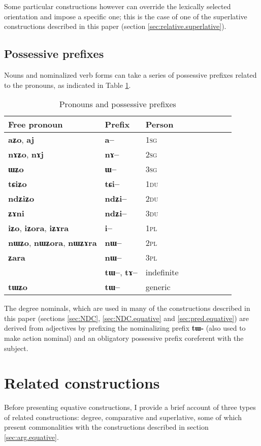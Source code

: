 \documentclass[oneside,a4paper,11pt]{article}
\newcommand{\ipa}[1]{{\phon\textbf{#1}}} %
\begin{document}
Some particular constructions however can override the lexically selected orientation and impose a specific one; this is the case of one of the superlative constructions described in this paper (section \ref{sec:relative.superlative}).

\subsection{Possessive prefixes} \label{sec:possessive}
Nouns and nominalized verb forms can take a series of possessive prefixes related to the pronouns, as indicated in Table \ref{tab:pronoun}. 


\begin{table}[H] \centering
\caption{Pronouns and possessive prefixes }\label{tab:pronoun}
\begin{tabular}{lllllllll} 
\toprule
 Free pronoun & Prefix & Person\\
\midrule
 \ipa{aʑo},    \ipa{aj} &	\ipa{a--}  &		1\textsc{sg} \\
\ipa{nɤʑo},  \ipa{nɤj} &	\ipa{nɤ--}  &			2\textsc{sg}\\
\ipa{ɯʑo}  &	\ipa{ɯ--}  &			3\textsc{sg}\\
\midrule
\ipa{tɕiʑo}  &	\ipa{tɕi--}  &			1\textsc{du} \\
\ipa{ndʑiʑo}  &	\ipa{ndʑi--}  &		2\textsc{du} \\	
\ipa{ʑɤni}  &	\ipa{ndʑi--}  &		3\textsc{du} \\	
\midrule
\ipa{iʑo}, \ipa{iʑora},   \ipa{iʑɤra}   &	\ipa{i--}  &			1\textsc{pl} \\
\ipa{nɯʑo}, \ipa{nɯʑora},   \ipa{nɯʑɤra}  &	\ipa{nɯ--}  &			2\textsc{pl} \\
\ipa{ʑara}  &	\ipa{nɯ--}  &			3\textsc{pl} \\
\midrule
&  \ipa{tɯ--},  \ipa{tɤ--} & indefinite \\
\ipa{tɯʑo} & \ipa{tɯ--}   &  generic\\
\bottomrule
\end{tabular}
\end{table}

The degree nominals, which are used in many of the constructions described in this paper (sections \ref{sec:NDC}, \ref{sec:NDC.equative} and \ref{sec:pred.equative}) are derived from adjectives by prefixing the nominalizing prefix \ipa{tɯ-} (also used to make action nominal) and an obligatory possessive prefix coreferent with the subject.

\section{Related constructions}
Before presenting equative constructions, I provide a brief account of three types of related constructions: degree, comparative and superlative, some of which present commonalities with the constructions described in section \ref{sec:arg.equative}.
\end{document}
